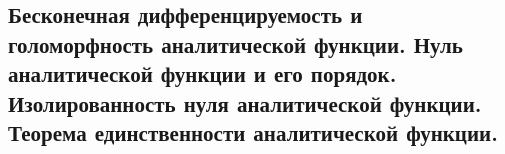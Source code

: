 \subsection{Бесконечная дифференцируемость и голоморфность аналитической функции. Нуль аналитической функции и его порядок. Изолированность нуля аналитической функции. Теорема единственности аналитической функции.}
